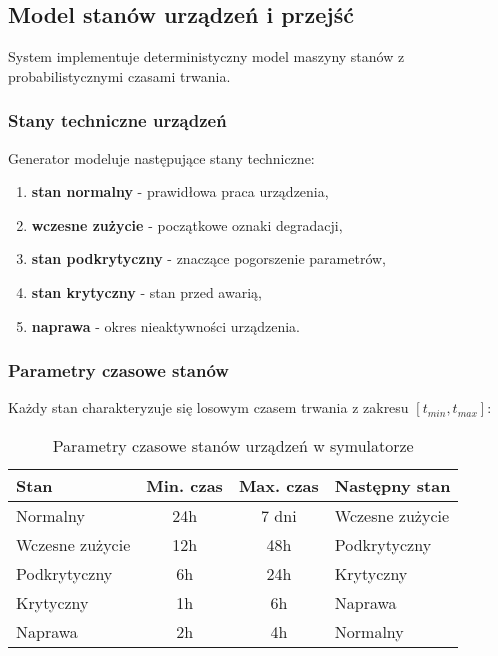 \subsection{Model stanów urządzeń i przejść}
\label{subsec:model_stanow}

System implementuje deterministyczny model maszyny stanów z probabilistycznymi czasami trwania.

\subsubsection{Stany techniczne urządzeń}

Generator modeluje następujące stany techniczne:

\begin{enumerate}
    \item \textbf{stan normalny} - prawidłowa praca urządzenia,
    \item \textbf{wczesne zużycie} - początkowe oznaki degradacji,
    \item \textbf{stan podkrytyczny} - znaczące pogorszenie parametrów,
    \item \textbf{stan krytyczny} - stan przed awarią,
    \item \textbf{naprawa} - okres nieaktywności urządzenia.
\end{enumerate}

\subsubsection{Parametry czasowe stanów}

Każdy stan charakteryzuje się losowym czasem trwania z zakresu $[t_{min}, t_{max}]$:

\begin{table}[h]
\centering
\begin{tabular}{|l|c|c|l|}
\hline
\textbf{Stan} & \textbf{Min. czas} & \textbf{Max. czas} & \textbf{Następny stan} \\
\hline
Normalny & 24h & 7 dni & Wczesne zużycie \\
Wczesne zużycie & 12h & 48h & Podkrytyczny \\
Podkrytyczny & 6h & 24h & Krytyczny \\
Krytyczny & 1h & 6h & Naprawa \\
Naprawa & 2h & 4h & Normalny \\
\hline
\end{tabular}
\caption{Parametry czasowe stanów urządzeń w symulatorze}
\label{tab:parametry_stanow_sim}
\end{table}

